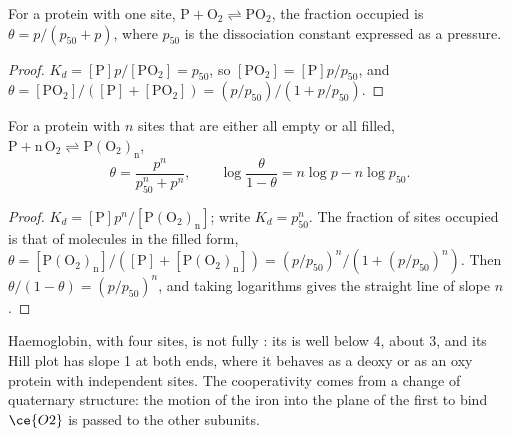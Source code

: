 \begin{proposition}\label{prop:b3:bioinorganic:hyperbola}
For a protein with one site, $\mathrm{P + O_2 \rightleftharpoons PO_2}$, the fraction occupied is $\theta = p/(p_{50} + p)$, where $p_{50}$ is
the dissociation constant expressed as a pressure.
\end{proposition}

\begin{proof}
$K_d = [\mathrm P]p/[\mathrm{PO_2}] = p_{50}$, so $[\mathrm{PO_2}] = [\mathrm P]p/p_{50}$, and $\theta = [\mathrm{PO_2}]/([\mathrm P] + [\mathrm{PO_2}]) = (p/p_{50})/(1 + p/p_{50})$.
\end{proof}

\begin{theorem}\label{thm:b3:bioinorganic:hill}
For a protein with $n$ sites that are either all empty or all filled,
$\mathrm{P + n\,O_2 \rightleftharpoons P(O_2)_n}$,
\[
  \theta = \frac{p^n}{p_{50}^n + p^n}, \qquad \log\frac{\theta}{1 - \theta} = n\log p - n\log p_{50}.
\]
\end{theorem}

\begin{proof}
$K_d = [\mathrm P]p^n/[\mathrm{P(O_2)_n}]$; write $K_d = p_{50}^n$. The fraction of sites occupied is that of molecules
in the filled form, $\theta = [\mathrm{P(O_2)_n}]/([\mathrm P] + [\mathrm{P(O_2)_n}]) = (p/p_{50})^n/(1 + (p/p_{50})^n)$. Then $\theta/(1 - \theta) = (p/p_{50})^n$, and taking
logarithms gives the straight line of slope $n$.
\end{proof}

Haemoglobin, with four sites, is not fully : its  is
well below 4, about 3, and its Hill plot has slope 1 at both ends, where
it behaves as a deoxy or as an oxy protein with independent sites. The
cooperativity comes from a change of quaternary structure: the motion of the
iron into the plane of the first  to bind $\ce{O2}$ is passed to the other subunits.

